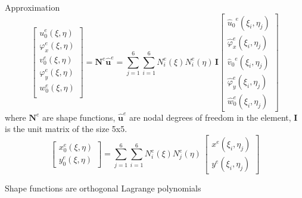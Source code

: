 \documentclass[10pt]{beamer} %
\renewcommand{\vec}[1]{\mathbf{#1}}
\newcommand{\bm}[1]{\mathbf{#1}}
\begin{document}
\begin{frame}[t]{Approximation}
	\begin{equation*}
	\left[\begin{array}{l} u_0^e(\xi, \eta) \\ \varphi_x^e(\xi, \eta)\\ v_0^e(\xi, \eta) \\ \varphi_y^e(\xi, \eta)\\ w_0^e(\xi, \eta)\\ \end{array}\right] = \bm{N}^e \vec{\hat{u}}^e = \sum \limits_{j=1}^{6} \sum \limits_{i=1}^{6} N^e_i(\xi) N^e_i(\eta)\, \bm{I} \left[ \begin{array}{l} {\hat{u}_0}^e(\xi_i,\eta_j)\\\hat{\varphi}_x^e(\xi_i,\eta_j)\\{\hat{v}_0}^e(\xi_i,\eta_j) \\\hat{\varphi}_y^e(\xi_i,\eta_j) \\ \hat{w}_0^e(\xi_i,\eta_j)\end{array} \right]\label{eq:delam_plateaproxim}
	\end{equation*}  
	where $\bm{N}^e$ are shape functions, $\vec{\hat{u}}^e$ are nodal degrees of freedom in the element, $\bm{I}$ is the unit matrix of the size 5x5.	
	\begin{equation*}
	\left[\begin{array}{l} x_0^e(\xi, \eta) \\ y_0^e(\xi, \eta)  \end{array}\right] = \sum \limits_{j=1}^{6} \sum \limits_{i=1}^{6} N^e_i(\xi) N^e_j(\eta)\, \left[ \begin{array}{l} x^e(\xi_i,\eta_j)\\y^e(\xi_i,\eta_j)\end{array} \right]\label{eq:delam_plategeom}
	\end{equation*}  
	\begin{alertblock}{Shape functions are orthogonal Lagrange polynomials}
	\end{alertblock}
\end{frame}
\end{document}
